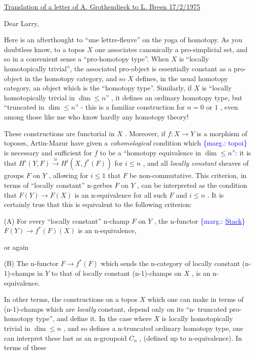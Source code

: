 \documentclass[11pt]{article}
\newcommand{\scanpage}[1]{\par\bigskip\noindent{\small\sffamily[scan #1]}\par}
\newcommand{\margin}[1]{\textcolor{blue}{\{\textsf{marg.:} #1\}}}
\newcommand{\uline}[1]{\underline{#1}}
\begin{document}
\clearpage
\scanpage{134-2/122}
\uline{Translation of a letter of A. Grothendieck to L. Breen 17/2/1975}

Dear Larry,

Here is an afterthought to ``une lettre-fleuve'' on the yoga of homotopy.
As you doubtless know, to a topos $X$ one associates canonically a pro-simplicial
set, and so in a convenient sense a ``pro-homotopy type''. When $X$ is ``locally
homotopically trivial'', the associated pro-object is essentially constant as
a pro-object in the homotopy category, and so $X$ defines, in the usual homotopy
category, an object which is the ``homotopy type''. Similarly, if $X$ is
``locally homotopically trivial in $\dim \leq n$'' , it defines an ordinary homotopy
type, but ``truncated in $\dim \leq n$'' - this is a familiar construction for $n = 0$
or $1$ , even among those like me who know hardly any homotopy theory!

These constructions are functorial in $X$ . Moreover, if $f : X \to Y$ is
a morphism of toposes, Artin-Mazur have given a \textit{cohomological} condition which \margin{topoi}
is necessary and sufficient for $f$ to be a ``homotopy equivalence in $\dim \leq n$'':
it is that $H^{i}(Y, F) \xrightarrow{\cong} H^{i}(X, f^{*}(F))$ for $i \leq n$ , and all \textit{locally constant}
sheaves of groups $F$ on $Y$ , allowing for $i \leq 1$ that $F$ be non-commutative.
This criterion, in terms of ``locally constant'' n-gerbes $F$ on $Y$ , can be
interpreted as the condition that $F(Y) \to F(X)$ is an n-equivalence for all
such $F$ and $i \leq n$ . It is certainly true that this is equivalent to the
following criterion:

(A) For every ``locally constant'' n-champ $F$ on $Y$ , the n-functor \margin{\uline{Stack}}
$F(Y) \to f^{*}(F)(X)$ is an n-equivalence,

or again

(B) The n-functor $F \to f^{*}(F)$ which sends the n-category of locally
constant (n-1)-champs in $Y$ to that of locally constant (n-1)-champs on
$X$ , is an n-equivalence.

In other terms, the constructions on a topos $X$ which one can make in
terms of (n-1)-champs which are \textit{locally} constant, depend only on its ``n-%
truncated pro-homotopy type'', and define it. In the case where $X$ is locally
homotopically trivial in $\dim \leq n$ , and so defines a n-truncated ordinary
homotopy type, one can interpret these last as an n-groupoid $C_{n}$ , (defined
up to n-equivalence). In terms of these
\end{document}
